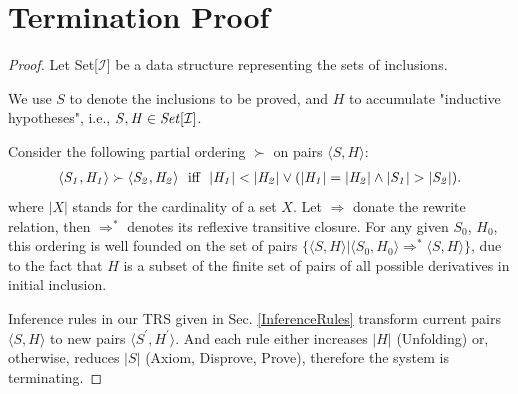 \documentclass[acmsmall,10pt,review]{acmart}
\newcommand{\code}[1]{{\tt{\ensuremath{\m{#1}}}}}
\newcommand{\m}{\mathit}
\newcommand{\inclusion}{\code{\mathcal{I}}}
\newcommand\secref[1]{Sec. \textcolor{black}{\ref{#1}}}
\begin{document}
{%








\appendix

\section{Termination Proof}  \label{proof:TerminationProof}

\begin{proof}\label{proof:termination} 
Let Set[\inclusion] be a data structure representing the sets of inclusions. 

We use \code{S} to denote the inclusions to be proved, and \code{H} to accumulate  "inductive hypotheses", i.e., \code{S,  H \in Set[\inclusion]}.

Consider the following partial ordering \code{\succ} on pairs \code{\langle S, H \rangle}:
\begin{gather*}
\code{\langle S_1, H_1 \rangle \succ \langle S_2, H_2 \rangle}\ \ \text{iff}\ \ \code{|H_1| < |H_2| \vee 
(|H_1| = |H_2| \wedge |S_1| > |S_2|)}. 
\end{gather*}
where \code{|X|} stands for the cardinality of a set \code{X}.  Let \code{\Rightarrow} donate the rewrite relation, then \code{\Rightarrow^*} denotes its reflexive transitive closure. For any given \code{S_0}, \code{H_0}, this ordering is well founded on the set of pairs \code{\{\langle S, H \rangle | \langle S_0, H_0 \rangle \Rightarrow^* \langle S, H \rangle \}}, due to the fact that \code{H} is a subset of the finite set of pairs of all possible derivatives in initial inclusion.


Inference rules in our TRS given in \secref{InferenceRules} transform current pairs \code{\langle S, H \rangle} to new pairs \code{\langle S^\prime, H^\prime \rangle}. 
And each rule either increases \code{|H|} (Unfolding) or, otherwise, reduces \code{|S|} (Axiom, Disprove, Prove), therefore the system is terminating.





\end{proof}}
\end{document}
